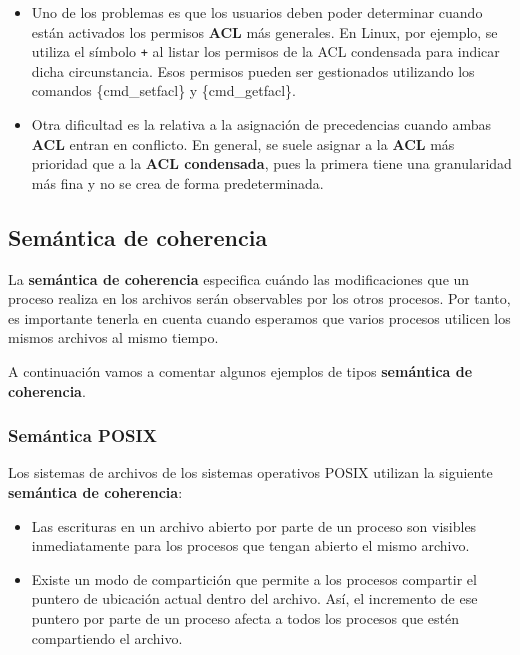 \begin{itemize}
\item
  Uno de los problemas es que los usuarios deben poder determinar cuando
  están activados los permisos \textbf{ACL} más generales. En Linux, por
  ejemplo, se utiliza el símbolo \texttt{+} al listar los permisos de la
  ACL condensada para indicar dicha circunstancia. Esos permisos pueden
  ser gestionados utilizando los comandos \{cmd\_setfacl\} y
  \{cmd\_getfacl\}.
\item
  Otra dificultad es la relativa a la asignación de precedencias cuando
  ambas \textbf{ACL} entran en conflicto. En general, se suele asignar a
  la \textbf{ACL} más prioridad que a la \textbf{ACL condensada}, pues
  la primera tiene una granularidad más fina y no se crea de forma
  predeterminada.
\end{itemize}

\subsection{Semántica de coherencia}\label{_semuxe1ntica_de_coherencia}

{} La \textbf{semántica de coherencia} especifica cuándo las
modificaciones que un proceso realiza en los archivos serán observables
por los otros procesos. Por tanto, es importante tenerla en cuenta
cuando esperamos que varios procesos utilicen los mismos archivos al
mismo tiempo.

A continuación vamos a comentar algunos ejemplos de tipos
\textbf{semántica de coherencia}.

\subsubsection{Semántica POSIX}\label{_semuxe1ntica_posix}

{} Los sistemas de archivos de los sistemas operativos POSIX utilizan la
siguiente \textbf{semántica de coherencia}:

\begin{itemize}
\item
  Las escrituras en un archivo abierto por parte de un proceso son
  visibles inmediatamente para los procesos que tengan abierto el mismo
  archivo.
\item
  Existe un modo de compartición que permite a los procesos compartir el
  puntero de ubicación actual dentro del archivo. Así, el incremento de
  ese puntero por parte de un proceso afecta a todos los procesos que
  estén compartiendo el archivo.
\end{itemize}

